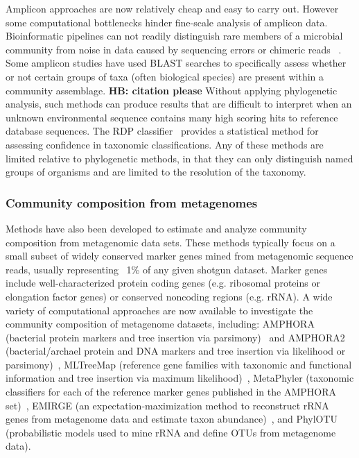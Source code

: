 \documentclass[10pt]{article}
\begin{document}
Amplicon approaches are now relatively cheap and easy to carry out. 
However some computational bottlenecks hinder fine-scale analysis of amplicon data. 
Bioinformatic pipelines can not readily distinguish rare members of a microbial community from noise in data caused by sequencing errors or chimeric reads ~\cite{Bik2012}. 
%
Some amplicon studies have used BLAST searches to specifically assess whether or not certain groups of taxa (often biological species) are present within a community assemblage. \textbf{HB: citation please} 
Without applying phylogenetic analysis, such methods can produce results that are difficult to interpret when an unknown environmental sequence contains many high scoring hits to reference database sequences. 
The RDP classifier~\cite{Wang2007} provides a statistical method for assessing confidence in taxonomic classifications.
Any of these methods are limited relative to phylogenetic methods, in that they can only distinguish named groups of organisms and are limited to the resolution of the taxonomy.
      
\subsubsection*{Community composition from metagenomes}

Methods have also been developed to estimate and analyze community composition from metagenomic data sets.
These methods typically focus on a small subset of widely conserved marker genes mined from metagenomic sequence reads, usually representing ~1\% of any given shotgun dataset. 
Marker genes include well-characterized protein coding genes (e.g. ribosomal proteins or elongation factor genes) or conserved noncoding regions (e.g. rRNA). 
A wide variety of computational approaches are now available to investigate the community composition of metagenome datasets, including: AMPHORA (bacterial protein markers and tree insertion via parsimony)~\cite{WuEisen2008} and AMPHORA2 (bacterial/archael protein and DNA markers and tree insertion via likelihood or parsimony)~\cite{Wu2012}, MLTreeMap (reference gene families with taxonomic and functional information and tree insertion via maximum likelihood)~\cite{Stark2010}, MetaPhyler (taxonomic classifiers for each of the reference marker genes published in the AMPHORA set)~\cite{Liu2010}, EMIRGE (an expectation-maximization method to reconstruct rRNA genes from metagenome data and estimate taxon abundance)~\cite{Miller2011}, and PhylOTU (probabilistic models used to mine rRNA and define OTUs from metagenome data)\cite{Sharpton2011}.
\end{document}
